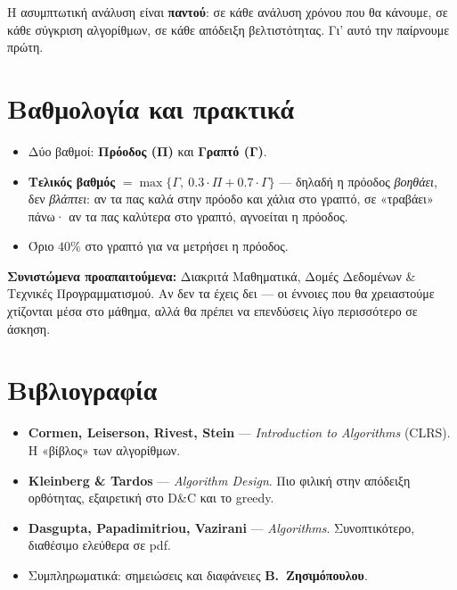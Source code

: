 \documentclass[11pt,a4paper]{article}
\begin{document}
Η ασυμπτωτική ανάλυση είναι \textbf{παντού}: σε κάθε ανάλυση χρόνου που θα
κάνουμε, σε κάθε σύγκριση αλγορίθμων, σε κάθε απόδειξη βελτιστότητας. Γι' αυτό την
παίρνουμε πρώτη.

\section{Βαθμολογία και πρακτικά}

\begin{itemize}
  \item Δύο βαθμοί: \textbf{Πρόοδος (Π)} και \textbf{Γραπτό (Γ)}.
  \item \textbf{Τελικός βαθμός} $= \max\{\Gamma,\ 0.3 \cdot \Pi + 0.7 \cdot
  \Gamma\}$ --- δηλαδή η πρόοδος \textit{βοηθάει}, δεν \textit{βλάπτει}: αν τα πας
  καλά στην πρόοδο και χάλια στο γραπτό, σε «τραβάει» πάνω· αν τα πας καλύτερα στο
  γραπτό, αγνοείται η πρόοδος.
  \item Όριο $40\%$ στο γραπτό για να μετρήσει η πρόοδος.
\end{itemize}

\begin{notebox}
\textbf{Συνιστώμενα προαπαιτούμενα:} Διακριτά Μαθηματικά, Δομές Δεδομένων \&
Τεχνικές Προγραμματισμού. Αν δεν τα έχεις δει --- οι έννοιες που θα χρειαστούμε
χτίζονται μέσα στο μάθημα, αλλά θα πρέπει να επενδύσεις λίγο περισσότερο σε
άσκηση.
\end{notebox}

\section{Βιβλιογραφία}

\begin{itemize}
  \item \textbf{Cormen, Leiserson, Rivest, Stein} --- \textit{Introduction to
  Algorithms} (CLRS). Η «βίβλος» των αλγορίθμων.
  \item \textbf{Kleinberg \& Tardos} --- \textit{Algorithm Design}. Πιο φιλική
  στην απόδειξη ορθότητας, εξαιρετική στο D\&C και το greedy.
  \item \textbf{Dasgupta, Papadimitriou, Vazirani} --- \textit{Algorithms}.
  Συνοπτικότερο, διαθέσιμο ελεύθερα σε pdf.
  \item Συμπληρωματικά: σημειώσεις και διαφάνειες \textbf{Β.~Ζησιμόπουλου}.
\end{itemize}
\end{document}
